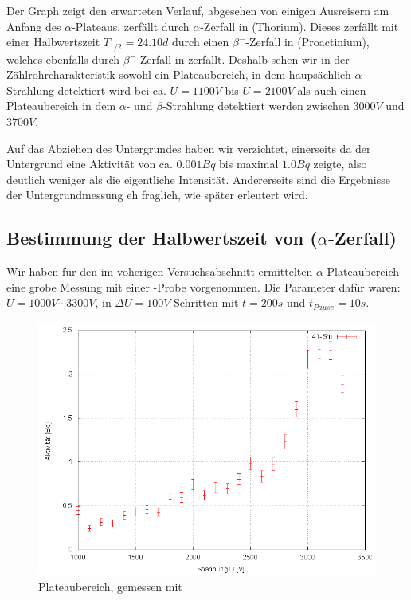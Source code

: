 Der Graph zeigt den erwarteten Verlauf, abgesehen von einigen Ausreisern am Anfang des $\alpha$-Plateaus.  zerfällt durch $\alpha$-Zerfall in  (Thorium). Dieses zerfällt mit einer Halbwertszeit $T_{1/2} = 24.10d$ durch einen $\beta^-$-Zerfall in  (Proactinium), welches ebenfalls durch $\beta^-$-Zerfall in  zerfällt. Deshalb sehen wir in der Zählrohrcharakteristik sowohl ein Plateaubereich, in dem haupsächlich $\alpha$-Strahlung detektiert wird bei ca. $U = 1100V$ bis $U = 2100V$ als auch einen Plateaubereich in dem $\alpha$- und $\beta$-Strahlung detektiert werden zwischen $3000V$ und $3700V$.

Auf das Abziehen des Untergrundes haben wir verzichtet, einerseits da der Untergrund eine Aktivität von ca. $0.001Bq$ bis maximal $1.0Bq$ zeigte, also deutlich weniger als die eigentliche Intensität. Andererseits sind die Ergebnisse der Untergrundmessung eh fraglich, wie später erleutert wird.

\subsection{Bestimmung der Halbwertszeit von  ($\alpha$-Zerfall)}

Wir haben für den im voherigen Versuchsabschnitt ermittelten $\alpha$-Plateaubereich eine grobe Messung mit einer -Probe vorgenommen. Die Parameter dafür waren: $U= 1000V \cdots 3300V$, in $\Delta U = 100 V$ Schritten mit $t=200s$ und $t_{Pause} = 10s$.

\begin{figure}[H]
 \centering \includegraphics[width=0.9\linewidth]{Messwerte/plots/Sm147_plateau.png}
 \caption{Plateaubereich, gemessen mit }
\end{figure}


